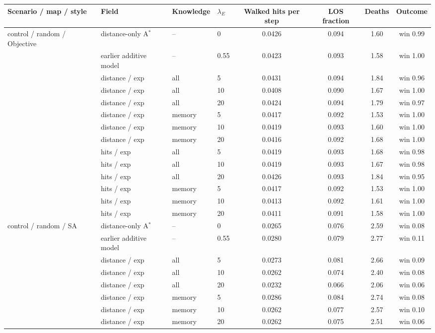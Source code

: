 \begin{tabular}{llllcccc}
\toprule
Scenario / map / style & Field & Knowledge & $\lambda_E$ & Walked hits per step & LOS fraction & Deaths & Outcome \\
\midrule
control / random / Objective & distance-only A$^*$ & -- & 0 & 0.0426 & 0.094 & 1.60 & win 0.99 \\
 & earlier additive model & -- & 0.55 & 0.0423 & 0.093 & 1.58 & win 1.00 \\
 & distance / exp & all & 5 & 0.0431 & 0.094 & 1.84 & win 0.96 \\
 & distance / exp & all & 10 & 0.0408 & 0.090 & 1.67 & win 1.00 \\
 & distance / exp & all & 20 & 0.0424 & 0.094 & 1.79 & win 0.97 \\
 & distance / exp & memory & 5 & 0.0417 & 0.092 & 1.53 & win 1.00 \\
 & distance / exp & memory & 10 & 0.0419 & 0.093 & 1.60 & win 1.00 \\
 & distance / exp & memory & 20 & 0.0416 & 0.092 & 1.68 & win 1.00 \\
 & hits / exp & all & 5 & 0.0419 & 0.093 & 1.68 & win 0.98 \\
 & hits / exp & all & 10 & 0.0419 & 0.093 & 1.67 & win 0.98 \\
 & hits / exp & all & 20 & 0.0426 & 0.093 & 1.84 & win 0.95 \\
 & hits / exp & memory & 5 & 0.0417 & 0.092 & 1.53 & win 1.00 \\
 & hits / exp & memory & 10 & 0.0413 & 0.092 & 1.61 & win 1.00 \\
 & hits / exp & memory & 20 & 0.0411 & 0.091 & 1.58 & win 1.00 \\
\midrule
control / random / SA & distance-only A$^*$ & -- & 0 & 0.0265 & 0.076 & 2.59 & win 0.08 \\
 & earlier additive model & -- & 0.55 & 0.0280 & 0.079 & 2.77 & win 0.11 \\
 & distance / exp & all & 5 & 0.0273 & 0.081 & 2.66 & win 0.09 \\
 & distance / exp & all & 10 & 0.0262 & 0.074 & 2.40 & win 0.08 \\
 & distance / exp & all & 20 & 0.0232 & 0.066 & 2.06 & win 0.06 \\
 & distance / exp & memory & 5 & 0.0286 & 0.084 & 2.74 & win 0.08 \\
 & distance / exp & memory & 10 & 0.0262 & 0.077 & 2.57 & win 0.10 \\
 & distance / exp & memory & 20 & 0.0262 & 0.075 & 2.51 & win 0.06 \\

\end{tabular}
